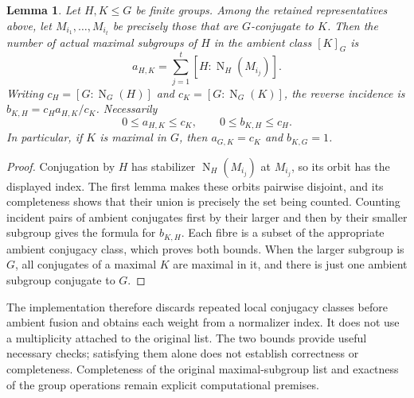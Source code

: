 \documentclass[11pt]{article}
\newtheorem{lemma}{Lemma}
\newcommand{\N}{\operatorname{N}}
\begin{document}
\begin{lemma}
Let $H,K\leq G$ be finite groups. Among the retained representatives above,
let $M_{i_1},\ldots,M_{i_t}$ be precisely those that are $G$-conjugate to $K$.
Then the number of actual maximal subgroups of $H$ in the ambient class
$[K]_G$ is
\[
 a_{H,K}=\sum_{j=1}^t[H:\N_H(M_{i_j})].
\]
Writing $c_H=[G:\N_G(H)]$ and $c_K=[G:\N_G(K)]$, the reverse incidence is
$b_{K,H}=c_Ha_{H,K}/c_K$. Necessarily
\[
 0\leq a_{H,K}\leq c_K,\qquad 0\leq b_{K,H}\leq c_H.
\]
In particular, if $K$ is maximal in $G$, then $a_{G,K}=c_K$ and
$b_{K,G}=1$.
\end{lemma}
\begin{proof}
Conjugation by $H$ has stabilizer $\N_H(M_{i_j})$ at $M_{i_j}$, so its orbit
has the displayed index. The first lemma makes these orbits pairwise
disjoint, and its completeness shows that their union is precisely the
set being counted. Counting incident pairs of ambient conjugates first
by their larger and then by their smaller subgroup gives the formula for
$b_{K,H}$. Each fibre is a subset of the appropriate ambient conjugacy
class, which proves both bounds. When the larger subgroup is $G$, all
conjugates of a maximal $K$ are maximal in it, and there is just one
ambient subgroup conjugate to $G$.
\end{proof}

The implementation therefore discards repeated local conjugacy classes
before ambient fusion and obtains each weight from a normalizer index.
It does not use a multiplicity attached to the original list. The two bounds
provide useful necessary checks; satisfying them alone does not establish
correctness or completeness. Completeness of the original maximal-subgroup
list and exactness of the group operations remain explicit computational
premises.
\end{document}
